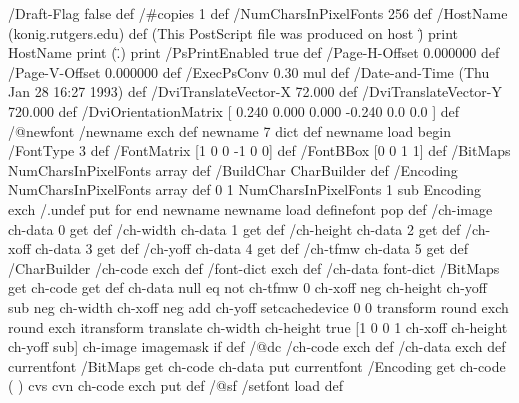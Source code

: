 /Draft-Flag false def
/#copies 1 def
/NumCharsInPixelFonts 256 def
/HostName (konig.rutgers.edu) def
(This PostScript file was produced on host \") print HostName print (\".\n) print
/PsPrintEnabled true def
/Page-H-Offset   0.000000 def
/Page-V-Offset   0.000000 def
/ExecPsConv {0.30 mul} def
/Date-and-Time (Thu Jan 28 16:27 1993) def
/DviTranslateVector-X   72.000 def
/DviTranslateVector-Y  720.000 def
/DviOrientationMatrix [    0.240    0.000    0.000
	   -0.240 0.0 0.0 ] def
/@newfont
{
/newname exch def
newname 7 dict def
newname load begin
/FontType 3 def
/FontMatrix [1 0 0 -1 0 0] def
/FontBBox [0 0 1 1] def
/BitMaps NumCharsInPixelFonts array def
/BuildChar {CharBuilder} def
/Encoding NumCharsInPixelFonts array def
0 1 NumCharsInPixelFonts 1 sub {Encoding exch /.undef put} for
end
newname newname load definefont pop
} def
/ch-image {ch-data 0 get} def
/ch-width {ch-data 1 get} def
/ch-height {ch-data 2 get} def
/ch-xoff  {ch-data 3 get} def
/ch-yoff  {ch-data 4 get} def
/ch-tfmw  {ch-data 5 get} def
/CharBuilder
{
/ch-code exch def
/font-dict exch def
/ch-data font-dict /BitMaps get ch-code get def
ch-data null eq not
{
ch-tfmw   0
ch-xoff neg
ch-height ch-yoff sub neg
ch-width  ch-xoff neg add
ch-yoff
setcachedevice
0 0 transform round exch round exch itransform translate
ch-width ch-height true
[1 0  0 1 ch-xoff ch-height ch-yoff sub] {ch-image} imagemask
}
if
} def
/@dc
{
/ch-code exch def
/ch-data exch def
currentfont /BitMaps get
ch-code ch-data put
currentfont /Encoding get
ch-code (   ) cvs   %
cvn
ch-code exch put
} def
/@sf /setfont load def

